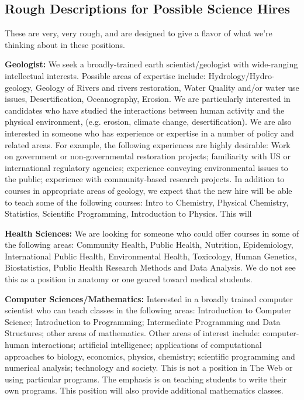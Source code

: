 \documentclass[12pt]{article}
\begin{document}
\subsection{Rough Descriptions for Possible Science Hires}

These are very, very rough, and are designed to give a flavor of what
we're thinking about in these positions.

{\bf Geologist:}  We seek a broadly-trained earth scientist/geologist
with wide-ranging intellectual interests.  Possible areas of expertise
include: Hydrology/Hydro-geology, Geology of Rivers and rivers
restoration, Water Quality and/or water use issues, Desertification,
Oceanography, Erosion.  We are particularly interested in candidates
who have studied the interactions between human activity and the
physical environment, (e.g. erosion, climate change, desertification).
We are also interested in someone who has experience or expertise in a
number of policy and related areas.  For example, the following
experiences are highly desirable: Work on government or
non-governmental restoration projects; familiarity with US or
international regulatory agencies; experience conveying environmental
issues to the public; experience with community-based research
projects.  In addition to courses in appropriate areas of geology, we
expect that the new hire will be able to teach some of the following
courses:  Intro to Chemistry, Physical Chemistry, Statistics,
Scientific Programming, Introduction to Physics.  This will 


{\bf Health Sciences:} We are looking for someone who could offer
courses in some of the following areas: Community Health, Public
Health, Nutrition, Epidemiology, International Public Health,
Environmental Health, Toxicology, Human Genetics, Biostatistics,
Public Health Research Methods and Data Analysis.  We do not see this
as a position in anatomy or one geared toward medical students.  

{\bf Computer Sciences/Mathematics:}  Interested in a broadly trained
computer scientist who can teach classes in the following areas:
Introduction to Computer Science; Introduction to Programming;
Intermediate Programming and Data Structures; other areas of
mathematics.  Other areas of interest include: computer-human
interactions; artificial intelligence; applications of computational
approaches to biology, economics, physics, chemistry; scientific
programming and numerical analysis; technology and society.  This is
not a position in The Web or using particular programs.  The emphasis
is on teaching students to write their own programs.  This position
will also provide additional mathematics classes.  
\end{document}
